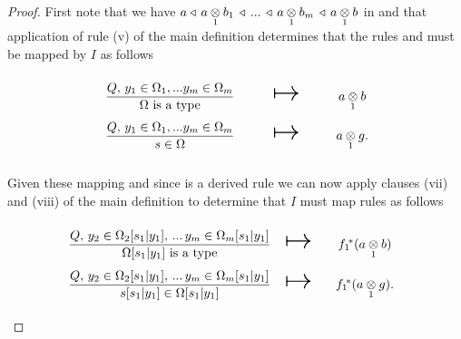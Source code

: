 {\begin{proof}
\newcommand{\sonerule} {\gatdisplayrule{Q}         {\ofT{s_1}{\Omega_1}}}
\newcommand{\stworule}  {\gatdisplayrule{Q}       {\ofT{s_2}{\Omega_2[s_1|y_1]}}}
\newcommand{\weakenedOmegarule}{\gatdisplayrule{Q,\, \yOmega{m}} {\isT{\Omega}} }
\newcommand{\weakenedsrule}    {\gatdisplayrule{Q,\, \yOmega{m}} {\ofT{s}{\Omega}} }
\newcommand{\weakenedOmegaruleFirstsubstitution}{\gatdisplayrule{Q,\, \ofT{y_2}{\Omega_2[s_1|y_1]},\,...\,\ofT{y_m}{\Omega_m[s_1|y_1]}}{\isT{\Omega[s_1|y_1]}} }
\newcommand{\weakenedsruleFirstsubstitution}{\gatdisplayrule{Q,\, \ofT{y_2}{\Omega_2[s_1|y_1]},\,...\,\ofT{y_m}{\Omega_m[s_1|y_1]}}{\ofT{s[s_1|y_1]}{\Omega[s_1|y_1]}} }
\newcommand{\weakenedOmegaruleSecondsubstitution}{\gatdisplayrule{Q,\, \ofT{y_3}{\Omega_2[s_1|y_1, s_2|y_2]},\,...\,\ofT{y_m}{\Omega_m[s_1|y_1, s_2|y_2]}}{\isT{\Omega[s_1|y_1, s_2|y_2]}} }
\newcommand{\weakenedsruleSecondsubstitution}{\gatdisplayrule{Q,\, \ofT{y_2}{\Omega_2[s_1|y_1, s_2|y_2]},\,...\,\ofT{y_m}{\Omega_m[s_1|y_1, s_2|y_2]}}{\ofT{s[s_1|y_1, s_2|y_2]}{\Omega[s_1|y_1, s_2|y_2]}} }
First note that we have $a \base\, \crossx{a}{b_1}{1}\, \base\, ...\, \base\, \crossx{a}{b_m}{1}\, \base\, \crossx{a}{b}{1}$ in \catcw
and  that application of rule (v) of the main definition determines that the rules \weakenedOmegarule and \weakenedsrule must be mapped by $I$ as follows
\begin{equation*}
\begin{array}{c c c}
\forceSOURCEwidth & & \forceTARGETwidth \\ [-0.1cm]
\weakenedOmegarule  & \Imapsto & \crossx{a}{b}{1}   \\ [0.4cm]
\weakenedsrule      & \Imapsto & \crossx{a}{g}{1}.
\end{array}
\end{equation*}

Given these mapping and since  \sonerule is a derived rule we can now apply clauses (vii) and (viii) of the main definition
to determine that $I$ must map rules as follows
\begin{equation*}
\begin{array}{c c c}
\forceSOURCEwidth & & \forceTARGETwidth \\ [-0.1cm]
\weakenedOmegaruleFirstsubstitution  & \Imapsto & \fonestar(\crossx{a}{b}{1})   \\ [0.4cm]
\weakenedsruleFirstsubstitution      & \Imapsto & \fonestar(\crossx{a}{g}{1}).
\end{array}
\end{equation*}


\end{proof}}
